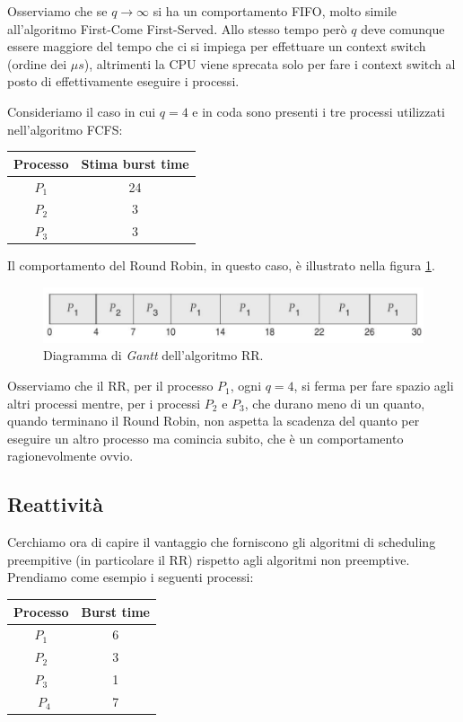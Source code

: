 Osserviamo che se $q \to\infty$ si ha un comportamento FIFO, molto simile all'algoritmo First-Come First-Served. Allo stesso tempo però $q$ deve comunque essere maggiore del tempo che ci si impiega per effettuare un context switch (ordine dei $\mu s$), altrimenti la CPU viene sprecata solo per fare i context switch al posto di effettivamente eseguire i processi. 

Consideriamo il caso in cui $q = 4$ e in coda sono presenti i tre processi utilizzati nell'algoritmo FCFS:
\begin{table}[h]
    \centering
    \begin{tabular}{c c}
        \textbf{Processo} & \textbf{Stima burst time} \\\hline
        $P_1$ & 24 \\
        $P_2$ & 3 \\
        $P_3$ & 3 \\\hline
    \end{tabular}
\end{table}

\noindent Il comportamento del Round Robin, in questo caso, è illustrato nella figura \ref{fig:RR}.
\begin{figure}[h]
    \centering
    \includegraphics[width = .75\textwidth]{../res/imgs/CPU scheduling/RR.png}
    \caption{Diagramma di \textit{Gantt} dell'algoritmo RR.}
    \label{fig:RR}
\end{figure}
Osserviamo che il RR, per il processo $P_1$, ogni $q = 4$, si ferma per fare spazio agli altri processi mentre, per i processi $P_2$ e $P_3$, che durano meno di un quanto, quando terminano il Round Robin, non aspetta la scadenza del quanto per eseguire un altro processo ma comincia subito, che è un comportamento ragionevolmente ovvio. 
% 
\subsection{Reattività}
Cerchiamo ora di capire il vantaggio che forniscono gli algoritmi di scheduling preempitive (in particolare il RR) rispetto agli algoritmi non preemptive. Prendiamo come esempio i seguenti processi:
\begin{table}[h]
    \centering
    \begin{tabular}{c c}
        \textbf{Processo} & \textbf{Burst time} \\\hline
        $P_1$ & 6 \\
        $P_2$ & 3 \\
        $P_3$ & 1 \\\
        $P_4$ & 7 \\\hline
    \end{tabular}
\end{table}

